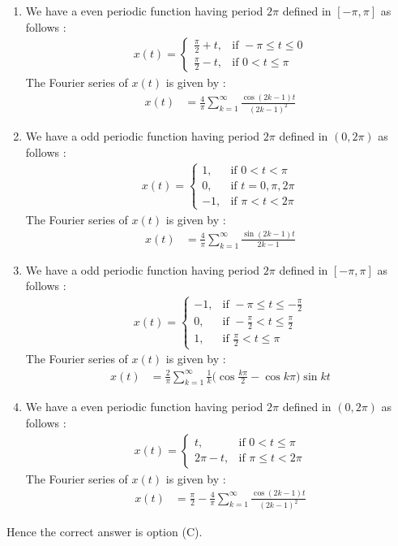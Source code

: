 \documentclass[journal,12pt,twocolumn]{IEEEtran}
\begin{document}
\begin{enumerate}
\item We have a even periodic function having period $2\pi$ defined in $[-\pi,\pi]$ as follows :
\begin{align}
x(t)=  
\begin{cases}
\frac{\pi}{2}+t, & \text{if } -\pi \leq t \leq 0\\
\frac{\pi}{2}-t, & \text{if } 0 < t \leq \pi \nonumber
\end{cases}
\end{align}
The Fourier series of $x(t)$ is given by :
\begin{align}
x(t) &= \frac{4}{\pi}\sum_{k=1}^{\infty}\frac{\cos{(2k-1)t}}{(2k-1)^{2}}
\end{align}
\item We have a odd periodic function having period $2\pi$ defined in $(0,2\pi)$ as follows :
\begin{align}
x(t)=  
\begin{cases}
1, & \text{if } 0 < t < \pi\\
0, & \text{if } t = 0,\pi,2\pi\\
-1, & \text{if } \pi < t < 2\pi \nonumber
\end{cases}
\end{align}
The Fourier series of $x(t)$ is given by :
\begin{align}
x(t) &= \frac{4}{\pi}\sum_{k=1}^{\infty}\frac{\sin{(2k-1)t}}{2k-1}
\end{align}
\item We have a odd periodic function having period $2\pi$ defined in $[-\pi,\pi]$ as follows :
\begin{align}
x(t)=  
\begin{cases}
-1, & \text{if } -\pi \leq t \leq -\frac{\pi}{2}\\
0, & \text{if } -\frac{\pi}{2} < t \leq \frac{\pi}{2}\\
1, & \text{if } \frac{\pi}{2} <  t  \leq \pi \nonumber
\end{cases}
\end{align}
The Fourier series of $x(t)$ is given by :
\begin{align}
x(t) &= \frac{2}{\pi}\sum_{k=1}^{\infty}\frac{1}{k}\Big(\cos{\frac{k\pi}{2}}-\cos{k\pi}\Big)\sin{kt}
\end{align}
\item We have a even periodic function having period $2\pi$ defined in $(0,2\pi)$ as follows :
\begin{align}
x(t)=  
\begin{cases}
t, & \text{if } 0 < t \leq \pi\\
2\pi-t, & \text{if } \pi \leq  t <  2\pi \nonumber
\end{cases}
\end{align}
The Fourier series of $x(t)$ is given by :
\begin{align}
x(t) &= \frac{\pi}{2}-\frac{4}{\pi}\sum_{k=1}^{\infty}\frac{\cos{(2k-1)t}}{(2k-1)^{2}}
\end{align}
\end{enumerate}
Hence the correct answer is option (C).
\end{document}

